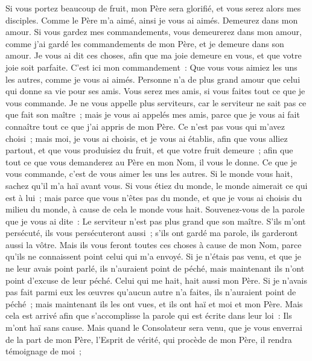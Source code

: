 \begin{multicols}{2}
Si vous portez beaucoup de fruit, mon Père sera glorifié, et vous serez alors mes disciples.
Comme le Père m'a aimé, ainsi je vous ai aimés. Demeurez dans mon amour.
Si vous gardez mes commandements, vous demeurerez dans mon amour, comme j'ai gardé les commandements de mon Père, et je demeure dans son amour.
Je vous ai dit ces choses, afin que ma joie demeure en vous, et que votre joie soit parfaite.
C'est ici mon commandement~: Que vous vous aimiez les uns les autres, comme je vous ai aimés.
Personne n'a de plus grand amour que celui qui donne sa vie pour ses amis.
Vous serez mes amis, si vous faites tout ce que je vous commande.
Je ne vous appelle plus serviteurs, car le serviteur ne sait pas ce que fait son maître~; mais je vous ai appelés mes amis, parce que je vous ai fait connaître tout ce que j'ai appris de mon Père.
Ce n'est pas vous qui m'avez choisi~; mais moi, je vous ai choisis, et je vous ai établis, afin que vous alliez partout, et que vous produisiez du fruit, et que votre fruit demeure~; afin que tout ce que vous demanderez au Père en mon Nom, il vous le donne.
Ce que je vous commande, c'est de vous aimer les uns les autres.
Si le monde vous hait, sachez qu'il m'a haï avant vous.
Si vous étiez du monde, le monde aimerait ce qui est à lui~; mais parce que vous n'êtes pas du monde, et que je vous ai choisis du milieu du monde, à cause de cela le monde vous hait.
Souvenez-vous de la parole que je vous ai dite~: Le serviteur n'est pas plus grand que son maître. S'ils m'ont persécuté, ils vous persécuteront aussi~; s'ils ont gardé ma parole, ils garderont aussi la vôtre.
Mais ils vous feront toutes ces choses à cause de mon Nom, parce qu'ils ne connaissent point celui qui m'a envoyé.
Si je n'étais pas venu, et que je ne leur avais point parlé, ils n'auraient point de péché, mais maintenant ils n'ont point d'excuse de leur péché.
Celui qui me hait, hait aussi mon Père.
Si je n'avais pas fait parmi eux les œuvres qu'aucun autre n'a faites, ils n'auraient point de péché~; mais maintenant ils les ont vues, et ils ont haï et moi et mon Père.
Mais cela est arrivé afin que s'accomplisse la parole qui est écrite dans leur loi~: Ils m'ont haï sans cause.
Mais quand le Consolateur sera venu, que je vous enverrai de la part de mon Père, l'Esprit de vérité, qui procède de mon Père, il rendra témoignage de moi~;

\end{multicols}
